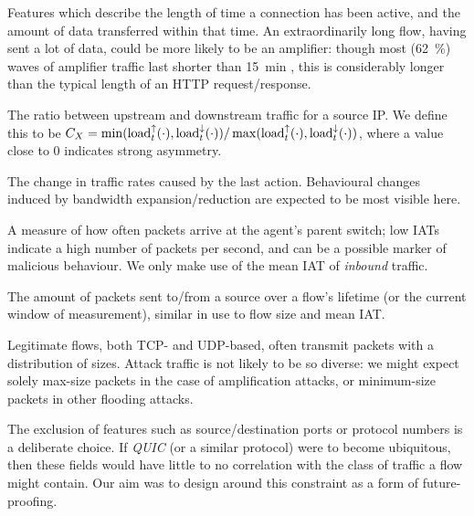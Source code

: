 Features which describe the length of time a connection has been active, and the amount of data transferred within that time.
An extraordinarily long flow, having sent a lot of data, could be more likely to be an amplifier: though most (\SI{62}{\percent}) waves of amplifier traffic last shorter than \SI{15}{\minute} \cite{DBLP:conf/raid/KramerKMNKYR15}, this is considerably longer than the typical length of an HTTP request/response.

The ratio between upstream and downstream traffic for a source IP.
We define this to be $C_X = \min(\operatorname{load}^{\uparrow}_{t}(\cdot), \operatorname{load}^{\downarrow}_{t}(\cdot))/\max(\operatorname{load}^{\uparrow}_{t}(\cdot), \operatorname{load}^{\downarrow}_{t}(\cdot))$, where a value close to 0 indicates strong asymmetry.

The change in traffic rates caused by the last action.
Behavioural changes induced by bandwidth expansion/reduction are expected to be most visible here.

A measure of how often packets arrive at the agent's parent switch; low IATs indicate a high number of packets per second, and can be a possible marker of malicious behaviour.
We only make use of the mean IAT of \emph{inbound} traffic.

The amount of packets sent to/from a source over a flow's lifetime (or the current window of measurement), similar in use to flow size and mean IAT.

Legitimate flows, both TCP- and UDP-based, often transmit packets with a distribution of sizes.
Attack traffic is not likely to be so diverse: we might expect solely max-size packets in the case of amplification attacks, or minimum-size packets in other flooding attacks.

The exclusion of features such as source/destination ports or protocol numbers is a deliberate choice.
If \emph{QUIC} (or a similar protocol) were to become ubiquitous, then these fields would have little to no correlation with the class of traffic a flow might contain.
Our aim was to design around this constraint as a form of future-proofing.

